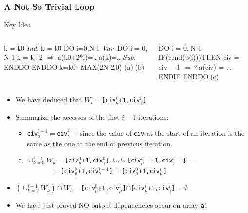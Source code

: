 \documentclass{beamer}
\newcommand{\emp}[1]{\textcolor{DikuRed}{ #1}}
\newcommand{\emphh}[1]{\textcolor{CosGreen}{ #1}}
\newcommand{\mymath}[1]{$ #1 $}
\begin{document}
\begin{frame}[fragile,t]
  \frametitle{A Not So Trivial Loop}

\begin{block}{Key Idea} 
\begin{columns} 
\begin{colorcode}
k = k0     \emphh{\em Ind.}  k = k0        
DO i=0,N-1 \emphh{\em Var.}  DO i = 0, N-1      
  k = k+2    \emphh{\mymath{\Rightarrow}}    a(k0+2*i)=.. 
  a(k)=..  \emphh{\em Sub.}  ENDDO         
ENDDO            k=k0+MAX(2N-2,0)
   (a)               (b) 
\end{colorcode}
\begin{colorcode}
DO i = 0, N-1
 IF(cond(b(i)))THEN 
    civ = civ + 1 \emp{\mymath{\Rightarrow}{\em ?}} 
    a(civ) = ...
ENDIF ENDDO
      (c)
\end{colorcode}

\end{columns}
\end{block}

\begin{itemize}
    \item We have deduced that $W_i = ${\tt [civ$_{\mu}^i$+1,civ$_{\gamma}^i$]}

    \item Summarize the accesses of the first $i-1$ iterations:
        \begin{itemize}
            \item {\tt civ$_{\mu}^{i+1} = $civ$_{\gamma}^{i-1}$}
                    since the value of {\tt civ} at the start of an iteration
                    is the same as the one at the end of previous iteration.
            \item $\cup_{k=0}^{i-1} W_k = ${\tt [civ$_{\mu}^0$+1,civ$_{\gamma}^0$]$\cup\ldots\cup$[civ$_{\mu}^{i-1}$+1,civ$_{\gamma}^{i-1}$]} $=$\\{\tt~~~~~~~$=$[civ$_{\mu}^0$+1,civ$_{\gamma}^{i-1}$]$=$[civ$_{\mu}^0$+1,civ$_{\mu}^{i}$]}

        \end  {itemize}

    \item $(\cup_{k=0}^{i-1} W_k) \cap W_i =${\tt[civ$_{\mu}^0$+1,civ$_{\mu}^{i}$]}$\cap${\tt [civ$_{\mu}^i$+1,civ$_{\gamma}^i$]}$= \emptyset$\medskip

    \item We have just proved NO output dependencies occur on array {\tt a}!
\end{itemize}

\end{frame}
\end{document}
